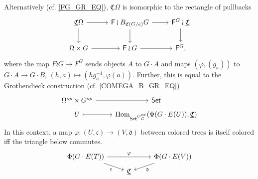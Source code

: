 \documentclass[a4paper,10pt
,draft
]{article}%
\renewcommand{\phi}{\varphi}
\newcommand{\UC}{\underline{\mathfrak C}}
\renewcommand{\1}{\ensuremath{\mathbb{id}}}
\begin{document}
\begin{remark}
      {\color{blue} %
      Alternatively (cf. \eqref{FG_GR_EQ}),
      $\UC \Omega$ is isomorphic to the rectangle of pullbacks
      \begin{equation}
            \label{COMEGA_FG_EQ}
            \begin{tikzcd}
                  \UC \Omega \arrow[d] \arrow[r]
                  &
                  \mathsf F \wr B_{\mathfrak C(G/e)}G \arrow[r] \arrow[d]
                  &
                  \mathsf F^G \wr \UC \arrow[d]
                  \\
                  \Omega \times G \arrow[r]
                  &
                  \mathsf F \wr G \arrow[r]
                  &
                  \mathsf F^G,
            \end{tikzcd}
      \end{equation}
      where the map $F \wr G \to F^G$ sends objects $A$ to $G \cdot A$ and
      maps $(\phi, (g_a))$ to $G \cdot A \to G \cdot B$, $(h, a) \mapsto (h g_a^{-1}, \phi(a))$.
      Further, this is equal to the Grothendieck construction (cf. \eqref{COMEGA_B_GR_EQ})
      \begin{equation}
            \label{COMEGA_FG_GR_EQ}
            \begin{tikzcd}[row sep = tiny]
                  \Omega^{op} \times G^{op} \arrow[r]
                  &
                  \mathsf{Set}
                  \\
                  U \arrow[r, mapsto]
                  &
                  \Hom_{\mathsf{Set}^{O_G^{op}}}(\Phi(G \cdot E(U)), \UC)
            \end{tikzcd}
      \end{equation}
      In this context, a map $\phi: (U,\mathfrak c) \to (V, \mathfrak d)$ between colored trees is itself colored iff
      the triangle below commutes.
      \begin{equation}
            \label{COLOR_MAP_FG_EQ}
            \begin{tikzcd}[row sep = tiny]
                  \Phi(G \cdot E(T)) \arrow[rr, "\phi"] \arrow[dr, "\mathfrak c"']
                  &&
                  \Phi(G \cdot E(V)) \arrow[dl, "\mathfrak d"]
                  \\
                  &
                  \UC
            \end{tikzcd}
      \end{equation}
      } %
\end{remark}
\end{document}
